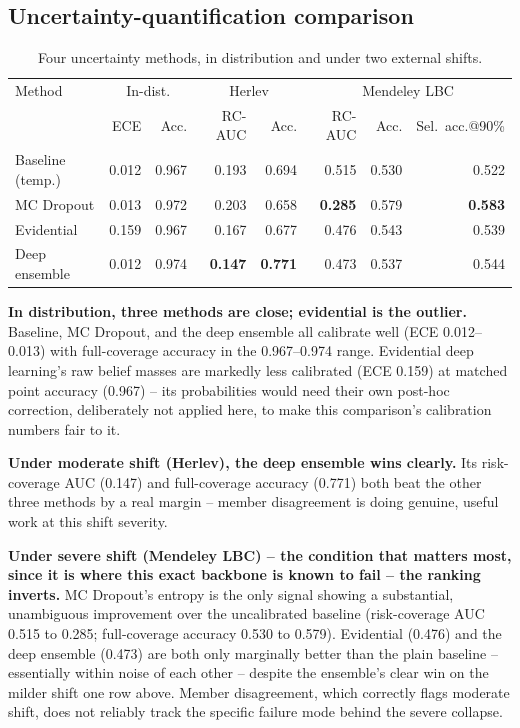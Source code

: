 \documentclass[runningheads]{llncs}
\begin{document}
\subsection{Uncertainty-quantification comparison}

\begin{table}[htbp]
\centering
\caption{Four uncertainty methods, in distribution and under two external shifts.}
\label{tab:rq2}
\begin{tabular}{lrrrrrrr}
\toprule
Method & \multicolumn{2}{c}{In-dist.} & \multicolumn{2}{c}{Herlev} & \multicolumn{3}{c}{Mendeley LBC} \\
 & ECE & Acc. & RC-AUC & Acc. & RC-AUC & Acc. & Sel.\ acc.@90\% \\
\midrule
Baseline (temp.) & 0.012 & 0.967 & 0.193 & 0.694 & 0.515 & 0.530 & 0.522 \\
MC Dropout & 0.013 & 0.972 & 0.203 & 0.658 & \textbf{0.285} & 0.579 & \textbf{0.583} \\
Evidential & 0.159 & 0.967 & 0.167 & 0.677 & 0.476 & 0.543 & 0.539 \\
Deep ensemble & 0.012 & 0.974 & \textbf{0.147} & \textbf{0.771} & 0.473 & 0.537 & 0.544 \\
\bottomrule
\end{tabular}
\end{table}

\textbf{In distribution, three methods are close; evidential is the
outlier.} Baseline, MC Dropout, and the deep ensemble all calibrate well
(ECE 0.012--0.013) with full-coverage accuracy in the 0.967--0.974 range.
Evidential deep learning's raw belief masses are markedly less calibrated
(ECE 0.159) at matched point accuracy (0.967) -- its probabilities would
need their own post-hoc correction, deliberately not applied here, to
make this comparison's calibration numbers fair to it.

\textbf{Under moderate shift (Herlev), the deep ensemble wins clearly.}
Its risk-coverage AUC (0.147) and full-coverage accuracy (0.771) both beat
the other three methods by a real margin -- member disagreement is doing
genuine, useful work at this shift severity.

\textbf{Under severe shift (Mendeley LBC) -- the condition that matters
most, since it is where this exact backbone is known to fail -- the
ranking inverts.} MC Dropout's entropy is the only signal showing a
substantial, unambiguous improvement over the uncalibrated baseline
(risk-coverage AUC 0.515 to 0.285; full-coverage accuracy 0.530 to 0.579).
Evidential (0.476) and the deep ensemble (0.473) are both only marginally
better than the plain baseline -- essentially within noise of each other
-- despite the ensemble's clear win on the milder shift one row above.
Member disagreement, which correctly flags moderate shift, does not
reliably track the specific failure mode behind the severe collapse.
\end{document}
